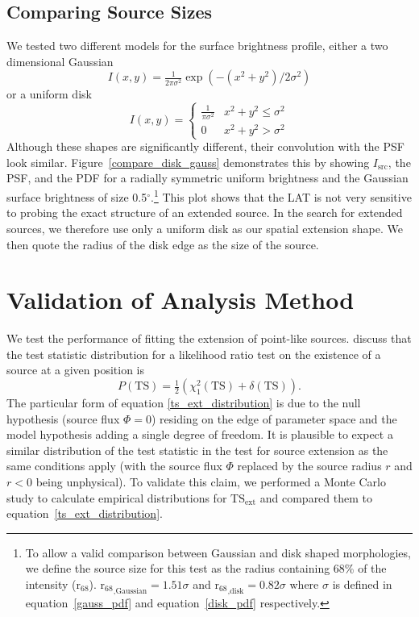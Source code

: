 \documentclass[12pt,preprint]{aastex}
\newcommand{\tsext}{{\ensuremath{\text{TS}_{\text{ext}}}}\xspace}
\newcommand{\rsixeight}{{\ensuremath{\text{r}_{68}}}\xspace}
\newcommand{\ts}{\text{TS}\xspace}
\renewcommand{\deg}{\ensuremath{^\circ}\xspace}
\newcommand{\pointlike}{\text{\em pointlike}\xspace}
\begin{document}
\subsection{Comparing Source Sizes}

\label{compare_source_size}

We tested two different models for the
surface brightness profile, either a two dimensional Gaussian
\begin{equation}\label{gauss_pdf}
  I(x,y)=\tfrac{1}{2\pi\sigma^2}\exp\left(-(x^2+y^2)/2\sigma^2\right)
\end{equation}
or a uniform disk
\begin{equation}\label{disk_pdf}
  I(x,y)=
  \begin{cases}
    \frac{1}{\pi\sigma^2} & x^2+y^2\le\sigma^2 \\
    0                      & x^2+y^2>\sigma^2
  \end{cases}
\end{equation}
Although these shapes are significantly different, their convolution
with the PSF look similar.  Figure~\ref{compare_disk_gauss}
demonstrates this by showing $I_\text{src}$, the PSF, and the PDF for
a radially symmetric uniform brightness and the Gaussian surface brightness of size 0.5\deg.\footnote{To
allow a valid comparison between Gaussian and disk shaped morphologies,
we define the source size for this test as the radius containing
68\% of the intensity ($\rsixeight$).  $\rsixeight_\text{,Gaussian}=1.51\sigma$
and $\rsixeight_\text{,disk}=0.82\sigma$ where $\sigma$
is defined in equation~\ref{gauss_pdf} and
equation~\ref{disk_pdf} respectively.} This plot shows that the LAT is 
not very sensitive to probing the exact structure of an extended source.
In the search for extended sources, we therefore use only a uniform
disk as our spatial extension shape. We then quote the radius of the
disk edge as the size of the source.

\section{Validation of Analysis Method}

\label{monte_carlo_validation}

We test the performance of \pointlike fitting the extension of
point-like sources.
\cite{mattox_egret} discuss that the test statistic distribution
for a likelihood ratio test on the existence of a source at
a given position is 
\begin{equation}\label{ts_ext_distribution}
  P(\ts)=\tfrac{1}{2}(\chi^2_1(\ts)+\delta(\ts)).
\end{equation}
The particular form of equation \ref{ts_ext_distribution} is
due to the null hypothesis (source flux $\Phi=0$) residing
on the edge of parameter space and the model hypothesis
adding a single degree of freedom. It is plausible to
expect a similar distribution of the test statistic
in the test for source extension as the same conditions
apply (with the source flux $\Phi$ replaced by the source radius $r$ and
$r<0$ being unphysical).
To validate this claim, we performed a Monte Carlo
study to calculate empirical distributions for $\tsext$ and
compared them to equation~\ref{ts_ext_distribution}.
\end{document}
